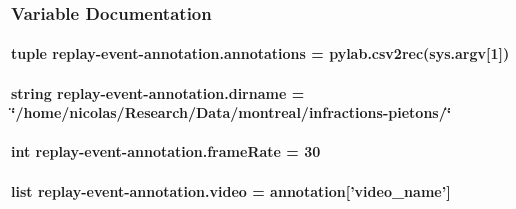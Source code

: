 \subsubsection{Variable Documentation}
\hypertarget{namespacereplay-event-annotation_aa9d30de64f986accd6450e022aa67577}{
\paragraph[{annotations}]{\setlength{\rightskip}{0pt plus 5cm}tuple replay-\/event-\/annotation.\-annotations = pylab.\-csv2rec(sys.\-argv\mbox{[}1\mbox{]})}}\label{namespacereplay-event-annotation_aa9d30de64f986accd6450e022aa67577}
\hypertarget{namespacereplay-event-annotation_aec1a96e110f52d9128022f8759551b05}{
\paragraph[{dirname}]{\setlength{\rightskip}{0pt plus 5cm}string replay-\/event-\/annotation.\-dirname = \char`\"{}/home/nicolas/Research/Data/montreal/infractions-\/pietons/\char`\"{}}}\label{namespacereplay-event-annotation_aec1a96e110f52d9128022f8759551b05}
\hypertarget{namespacereplay-event-annotation_a71eea50b81803515087ff66cbc3cdb68}{
\paragraph[{frame\-Rate}]{\setlength{\rightskip}{0pt plus 5cm}int replay-\/event-\/annotation.\-frame\-Rate = 30}}\label{namespacereplay-event-annotation_a71eea50b81803515087ff66cbc3cdb68}
\hypertarget{namespacereplay-event-annotation_a2ab142bc2d897e17680b45c778eb5a3e}{
\paragraph[{video}]{\setlength{\rightskip}{0pt plus 5cm}list replay-\/event-\/annotation.\-video = annotation\mbox{[}'video\-\_\-name'\mbox{]}}}\label{namespacereplay-event-annotation_a2ab142bc2d897e17680b45c778eb5a3e}
